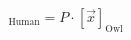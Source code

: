 \documentclass[preview]{standalone}
\begin{document}
\begin{align*}
[\vec{x}]_{\text{Human}} = P \cdot [\vec{x}]_{\text{Owl}}
\end{align*}
\end{document}
